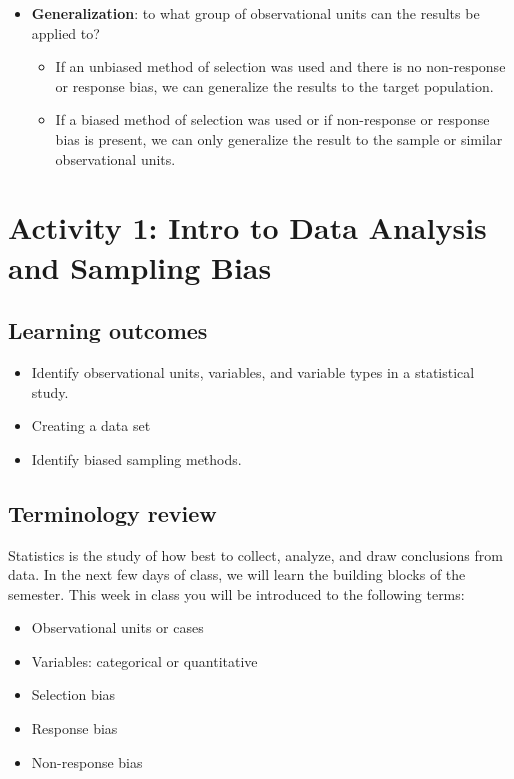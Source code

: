 \documentclass[
]{report}
\begin{document}
\newpage

\begin{itemize}
\item
  \textbf{Generalization}: to what group of observational units can the results be applied to?

  \begin{itemize}
  \item
    If an unbiased method of selection was used and there is no non-response or response bias, we can generalize the results to the target population.
  \item
    If a biased method of selection was used or if non-response or response bias is present, we can only generalize the result to the sample or similar observational units.
  \end{itemize}
\end{itemize}

\newpage

\section{Activity 1: Intro to Data Analysis and Sampling Bias}\label{activity-1-intro-to-data-analysis-and-sampling-bias}


\subsection{Learning outcomes}\label{learning-outcomes}

\begin{itemize}
\item
  Identify observational units, variables, and variable types in a statistical study.
\item
  Creating a data set
\item
  Identify biased sampling methods.
\end{itemize}

\subsection{Terminology review}\label{terminology-review}

Statistics is the study of how best to collect, analyze, and draw conclusions from data. In the next few days of class, we will learn the building blocks of the semester. This week in class you will be introduced to the following terms:

\begin{itemize}
\item
  Observational units or cases
\item
  Variables: categorical or quantitative
\item
  Selection bias
\item
  Response bias
\item
  Non-response bias
\end{itemize}
\end{document}
